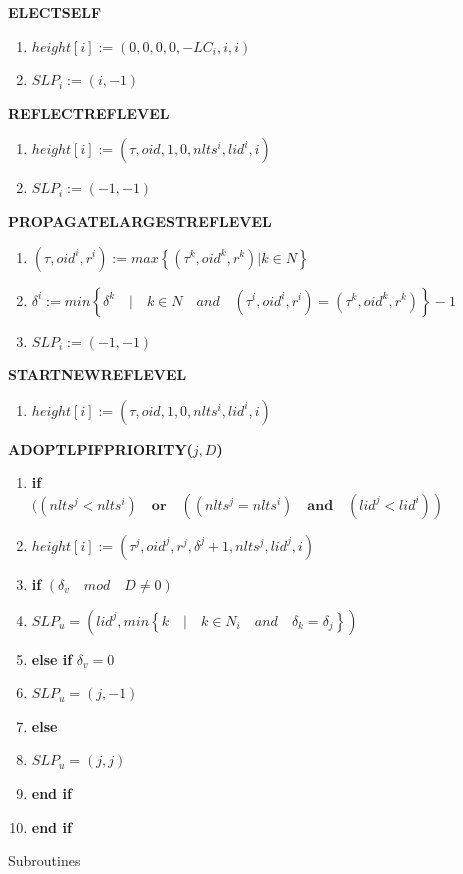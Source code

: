 \documentclass{article}
\begin{document}
\begin{figure}[hbtp]

\textbf{ELECTSELF}
\begin{enumerate}
\item $ height[i] := (0,0,0,0,-LC_{i},i,i) $
\item $SLP_i := (i,-1)$
\end{enumerate}

\textbf{REFLECTREFLEVEL}
\begin{enumerate}
\item $ height[i] := (\tau ,oid,1,0,nlts^{i},lid^i,i)$
\item $SLP_i := (-1,-1)$
\end{enumerate}


\textbf{PROPAGATELARGESTREFLEVEL}
\begin{enumerate}
\item $ (\tau , oid^{i}, r^{i}) := max\left\lbrace (\tau ^{k},oid^{k},r^{k}) \vert k\in N\right\rbrace  $
\item $ \delta ^{i} := min \left\lbrace \delta ^{k} \quad \vert \quad k \in N \quad and \quad (\tau ^{i} , oid^{i}, r^{i}) = (\tau ^{k},oid^{k},r^{k})\right\rbrace - 1 $
\item $SLP_i := (-1,-1)$
\end{enumerate}

\textbf {STARTNEWREFLEVEL}
\begin{enumerate}
\item $ height[i] := (\tau ,oid,1,0,nlts^{i},lid^i,i) $
\end{enumerate}

\textbf {ADOPTLPIFPRIORITY($j, D$)}
\begin{enumerate}
\item \textbf{if}$( (nlts^{j}<nlts^{i})\quad \textbf{or} \quad ((nlts^{j}=nlts^{i}) \quad \textbf{and} \quad (lid^{j} < lid^{i}))$
\item  \quad $ height[i] := (\tau ^{j} ,oid^{j},r^{j},\delta ^{j}+1,nlts^{j},lid^j,i) $

\item \quad \textbf{if} $ (\delta _{v} \quad mod \quad D \neq 0) $
\item \quad \quad $ SLP_u = (lid^j, min \left\lbrace k \quad \vert \quad k\in N_i \quad and \quad \delta_k = \delta_j \right\rbrace  )$
\item \quad \textbf{else if } $ \delta_v = 0 $
\item \quad \quad $ SLP_u = (j, -1)$
\item \quad \textbf{else}
\item \quad \quad $ SLP_u = (j, j)$
\item \quad \textbf{end if}
\item \textbf{end if}
\end{enumerate}

\caption{Subroutines}

\end{figure}
\end{document}
